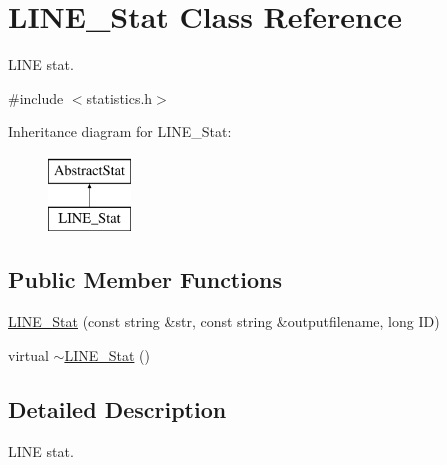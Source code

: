 \hypertarget{classLINE__Stat}{
\section{LINE\_\-Stat Class Reference}
\label{classLINE__Stat}
}


LINE stat.  




{\ttfamily \#include $<$statistics.h$>$}

Inheritance diagram for LINE\_\-Stat:\begin{figure}[H]
\begin{center}
\leavevmode
\includegraphics[height=2.000000cm]{classLINE__Stat}
\end{center}
\end{figure}
\subsection*{Public Member Functions}
\begin{DoxyCompactItemize}
\item 
\hyperlink{classLINE__Stat_a47df9b2c458dde5fbd0d626f3160297c}{LINE\_\-Stat} (const string \&str, const string \&outputfilename, long ID)
\item 
virtual \hyperlink{classLINE__Stat_a134f90d180cf462e41595ae257218781}{$\sim$LINE\_\-Stat} ()
\end{DoxyCompactItemize}


\subsection{Detailed Description}
LINE stat. 

